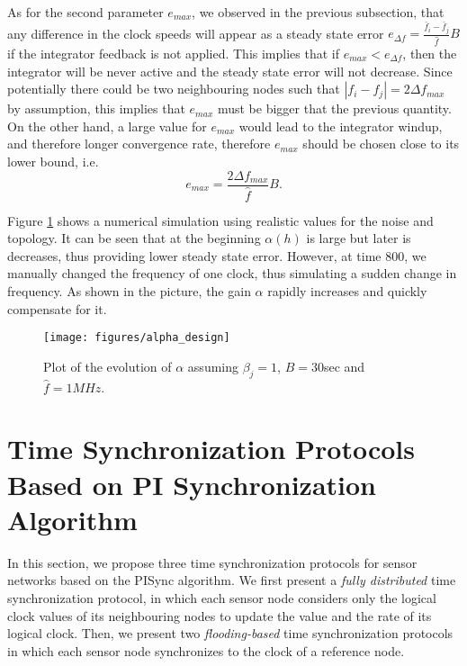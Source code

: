 \documentclass[english,a4paper,10pt,final]{article}
\numberwithin{equation}{section}
\numberwithin{figure}{section}
\begin{document}
As for the second parameter $e_{max}$, we observed in the previous subsection, that any difference in the clock speeds will appear as a steady state error $e_{\Delta f}=\frac{\bar f_i-\bar f_j}{\hat f} B$ if the integrator feedback is not applied. This implies that if $e_{max}<e_{\Delta f}$, then the integrator will be never active and the steady state error will not decrease. Since potentially there could be two neighbouring nodes such that $|f_i-f_j|=2\Delta \! f_{max}$ by assumption, this implies that  $e_{max}$ must be bigger that the previous quantity. On the other hand, a large value for $e_{max}$ would lead to the integrator windup, and therefore longer convergence rate, therefore $e_{max}$ should be chosen close to its lower bound, i.e.
\begin{equation}\label{eqn:emax_lower_bound}
e_{max}=   \frac{2\Delta\!f_{max} }{\hat f}B.
\end{equation}

Figure \ref{fig:alpha_design} shows a numerical simulation using realistic values for the noise and topology. It can be seen that at the beginning $\alpha(h)$ is large but later is decreases, thus providing lower steady state error. However, at time 800, we manually changed the frequency of one clock, thus simulating a sudden change in frequency. As shown in the picture, the gain $\alpha$ rapidly increases and quickly compensate for it.

\begin{figure} 
\center

\texttt{[image: figures/alpha\_design]} 

\caption{\label{fig:alpha_design} Plot of the evolution of $\alpha$ assuming $\beta_j=1$, $B=30$sec and $\hat f =1MHz$.}
\end{figure}

\section{Time Synchronization Protocols Based on PI Synchronization Algorithm}
\label{sec:Protocols}

In this section, we propose three time synchronization protocols for sensor networks based on the PISync algorithm. We first present a \textit{fully distributed} time synchronization protocol, in which each sensor node considers only the logical clock values of its neighbouring nodes to update the value and the rate of its logical clock. 
 Then, we present two \textit{flooding-based} time synchronization protocols in which each sensor node synchronizes to the clock of a reference node.
\end{document}
